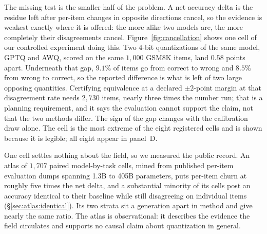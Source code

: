 The missing test is the smaller half of the problem. A net accuracy delta is the
residue left after per-item changes in opposite directions cancel, so the
evidence is weakest exactly where it is offered: the more alike two models are,
the more completely their disagreements cancel.
Figure~\ref{fig:cancellation} shows one cell of our controlled experiment doing
this. Two 4-bit quantizations of the same model, GPTQ and AWQ, scored on the
same $1{,}000$ GSM8K items, land $0.58$ points apart. Underneath that gap,
$9.1\%$ of items go from correct to wrong and $8.5\%$ from wrong to correct, so
the reported difference is what is left of two large opposing quantities.
Certifying equivalence at a declared $\pm 2$-point margin at that disagreement
rate needs $2{,}730$ items, nearly three times the number run; that is a
planning requirement, and it says the evaluation cannot support the claim, not
that the two methods differ. The sign of the gap changes with the calibration
draw alone. The cell is the most extreme of the eight registered cells and is
shown because it is legible; all eight appear in panel~D.



One cell settles nothing about the field, so we measured the public record. An
atlas of $1{,}707$ paired model-by-task cells, mined from published per-item
evaluation dumps spanning 1.3B to 405B parameters, puts per-item churn at
roughly five times the net delta, and a substantial minority of its cells post
an accuracy identical to their baseline while still disagreeing on individual
items
(\S\ref{sec:atlas:identical}). Its two strata sit a generation apart in method
and give nearly the same ratio. The atlas is observational: it describes the
evidence the field circulates and supports no causal claim about quantization in
general.

